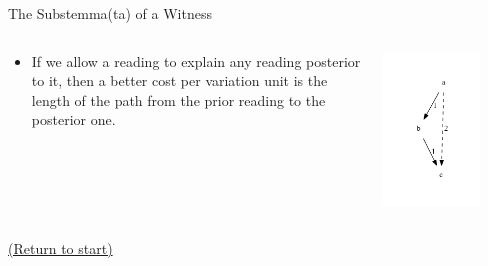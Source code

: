 \documentclass[10pt]{beamer}
\begin{document}
	\begin{frame}{The Substemma(ta) of a Witness}
		\begin{columns}
			\begin{column}{0.45\textwidth}
				\begin{itemize}
					\item If we allow a reading to explain any reading posterior to it, then a better cost per variation unit is the length of the path from the prior reading to the posterior one.
				\end{itemize}
			\end{column}
			\begin{column}{0.45\textwidth}
				\begin{center}
					\includegraphics[width=0.75\textwidth]{../graphics/transitivity-cost.pdf}
				\end{center}
			\end{column}
		\end{columns}
		\begin{center}
			\hyperlink{slide:crossroad}{(Return to start)}
		\end{center}
	\end{frame}
\end{document}
